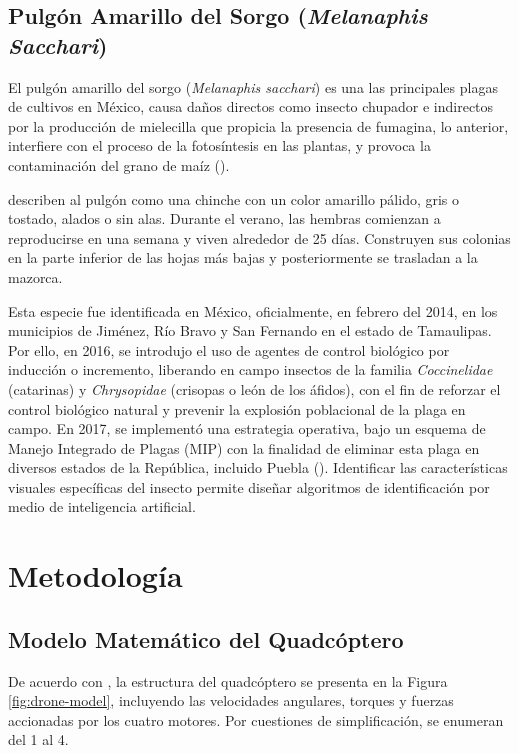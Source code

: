 \documentclass[11pt]{exam}
\begin{document}
        \subsection{Pulg\'on Amarillo del Sorgo (\textit{Melanaphis Sacchari})}\label{sec2.4}
        El pulg\'on amarillo del sorgo (\textit{Melanaphis sacchari}) es una las principales plagas de cultivos en M\'exico, causa daños directos como insecto chupador e indirectos por la producci\'on de mielecilla que propicia la presencia de fumagina, lo anterior, interfiere con el proceso de la fotos\'intesis en las plantas, y provoca la contaminaci\'on del grano de ma\'iz (\cite{pecina-2021}). 

        \cite{hakeem-2019} describen al pulg\'on como una chinche con un color amarillo p\'alido, gris o tostado, alados o sin alas. Durante el verano, las hembras comienzan a reproducirse en una semana y viven alrededor de 25 d\'ias. Construyen sus colonias en la parte inferior de las hojas más bajas y posteriormente se trasladan a la mazorca. 

        Esta especie fue identificada en M\'exico, oficialmente, en febrero del 2014, en los municipios de Jim\'enez, R\'io Bravo y San Fernando en el estado de Tamaulipas. Por ello, en 2016, se introdujo el uso de agentes de control biol\'ogico por inducci\'on o incremento, liberando en campo insectos de la familia \textit{Coccinelidae} (catarinas) y \textit{Chrysopidae} (crisopas o le\'on de los \'afidos), con el fin de reforzar el control biol\'ogico natural y prevenir la explosi\'on poblacional de la plaga en campo. En 2017, se implement\'o una estrategia operativa, bajo un esquema de Manejo Integrado de Plagas (MIP) con la finalidad de eliminar esta plaga en diversos estados de la República, incluido Puebla (\cite{senasica-2018}). Identificar las características visuales específicas del insecto permite diseñar algoritmos de identificación por medio de inteligencia artificial.

    \section{Metodolog\'ia}\label{sec3}
        \subsection{Modelo Matem\'atico del Quadc\'optero}\label{sec3.1}
        De acuerdo con \textcite{luukkonen-2011}, la estructura del quadc\'optero se presenta en la Figura \ref{fig:drone-model}, incluyendo las velocidades angulares, torques y fuerzas accionadas por los cuatro motores. Por cuestiones de simplificaci\'on, se enumeran del 1 al 4.
\end{document}
